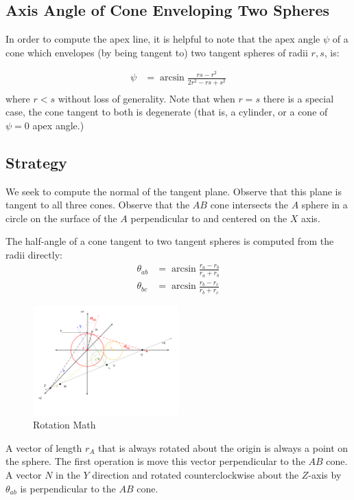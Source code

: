\documentclass{article}
\begin{document}
\subsection{Axis Angle of Cone Enveloping Two Spheres}

In order to compute the apex line, it is helpful
to note that the apex angle $\psi$ of a cone which envelopes (by being tangent to) two tangent
spheres of radii $r,s$, is:

\begin{align}
 \psi &= \arcsin{\frac{r s - r^2}{2 r^2 - r s + s^2}} \\
\end{align}
where $r < s$ without loss of generality. Note that when $r = s$
there is a special case,
the cone tangent to both is degenerate (that is, a cylinder, or a cone of
$\psi = 0$ apex angle.)

\subsection{Strategy}

We seek to compute the normal of the tangent plane.
Observe that this plane is tangent to all three cones.
Observe that the $AB$ cone intersects
the $A$ sphere in a circle on the surface of the $A$ perpendicular to and centered on the $X$ axis.

The half-angle of a cone tangent to two tangent spheres is computed from the radii directly:
\begin{align}
  \theta_{ab} &= \arcsin{\frac{r_a - r_b}{r_a + r_b}} \\
  \theta_{bc} &= \arcsin{\frac{r_b - r_c}{r_b + r_c}}
\end{align}


\begin{figure}
     \centering
     \includegraphics[width=0.5\textwidth]{figures/RotationMath.png}
     \caption{Rotation Math}
  \label{fig:rotation}
\end{figure}

A vector of length $r_A$ that is always rotated about the origin is always a point on the sphere.
The first operation is move this vector perpendicular to the $AB$ cone.
A vector $N$ in the $Y$ direction and rotated counterclockwise
about the $Z$-axis by $\theta_{ab}$ is perpendicular to the $AB$ cone.
\end{document}
